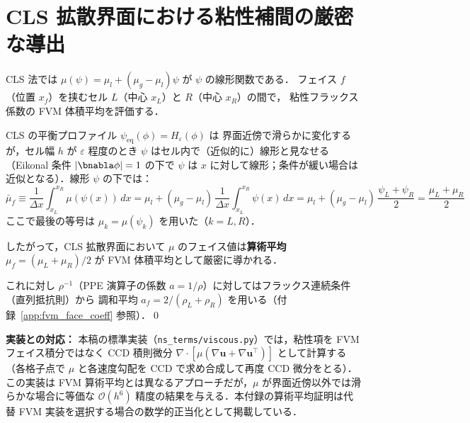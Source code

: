 \section{CLS 拡散界面における粘性補間の厳密な導出}
\label{app:mu_interp_derivation}

CLS 法では $\mu(\psi) = \mu_l + (\mu_g - \mu_l)\psi$ が $\psi$ の線形関数である．
フェイス $f$（位置 $x_f$）を挟むセル $L$（中心 $x_L$）と $R$（中心 $x_R$）の間で，
粘性フラックス係数の FVM 体積平均を評価する．

CLS の平衡プロファイル $\psi_{\mathrm{eq}}(\phi) = H_\varepsilon(\phi)$ は
界面近傍で滑らかに変化するが，セル幅 $h$ が $\varepsilon$ 程度のとき
$\psi$ はセル内で（近似的に）線形と見なせる（Eikonal 条件 $|\bnabla\phi|=1$ の下で
$\psi$ は $x$ に対して線形；条件が緩い場合は近似となる）．線形 $\psi$ の下では：
\[
  \bar{\mu}_f
  \equiv \frac{1}{\Delta x}\int_{x_L}^{x_R} \mu(\psi(x))\,dx
  = \mu_l + (\mu_g-\mu_l)\,\frac{1}{\Delta x}\int_{x_L}^{x_R}\psi(x)\,dx
  = \mu_l + (\mu_g-\mu_l)\,\frac{\psi_L+\psi_R}{2}
  = \frac{\mu_L+\mu_R}{2}
\]
ここで最後の等号は $\mu_k = \mu(\psi_k)$ を用いた（$k=L,R$）．

したがって，CLS 拡散界面において $\mu$ のフェイス値は\textbf{算術平均}
$\mu_f = (\mu_L+\mu_R)/2$ が FVM 体積平均として厳密に導かれる．

これに対し $\rho^{-1}$（PPE 演算子の係数 $a = 1/\rho$）に対してはフラックス連続条件（直列抵抗則）から
調和平均 $a_f = 2/(\rho_L+\rho_R)$ を用いる（付録~\ref{app:fvm_face_coeff} 参照）．\qed

\noindent\textbf{実装との対応：} 本稿の標準実装（\texttt{ns\_terms/viscous.py}）では，粘性項を FVM フェイス積分ではなく CCD 積則微分 $\nabla\cdot[\mu(\nabla\bm{u}+\nabla\bm{u}^\top)]$ として計算する（各格子点で $\mu$ と各速度勾配を CCD で求め合成して再度 CCD 微分をとる）．この実装は FVM 算術平均とは異なるアプローチだが，$\mu$ が界面近傍以外では滑らかな場合に等価な $\mathcal{O}(h^6)$ 精度の結果を与える．本付録の算術平均証明は代替 FVM 実装を選択する場合の数学的正当化として掲載している．

